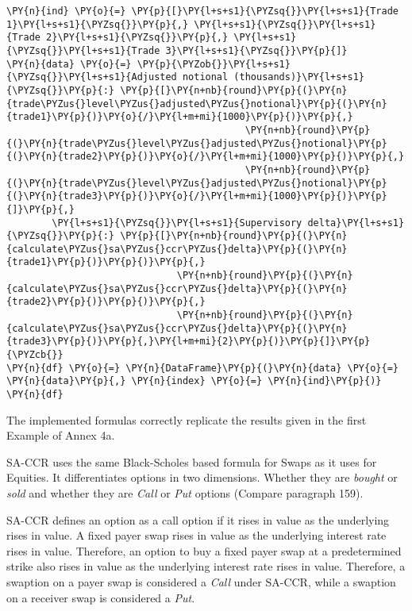     \begin{tcolorbox}[breakable, size=fbox, boxrule=1pt, pad at break*=1mm,colback=cellbackground, colframe=cellborder]
\begin{Verbatim}[commandchars=\\\{\}]
\PY{n}{ind} \PY{o}{=} \PY{p}{[}\PY{l+s+s1}{\PYZsq{}}\PY{l+s+s1}{Trade 1}\PY{l+s+s1}{\PYZsq{}}\PY{p}{,} \PY{l+s+s1}{\PYZsq{}}\PY{l+s+s1}{Trade 2}\PY{l+s+s1}{\PYZsq{}}\PY{p}{,} \PY{l+s+s1}{\PYZsq{}}\PY{l+s+s1}{Trade 3}\PY{l+s+s1}{\PYZsq{}}\PY{p}{]}
\PY{n}{data} \PY{o}{=} \PY{p}{\PYZob{}}\PY{l+s+s1}{\PYZsq{}}\PY{l+s+s1}{Adjusted notional (thousands)}\PY{l+s+s1}{\PYZsq{}}\PY{p}{:} \PY{p}{[}\PY{n+nb}{round}\PY{p}{(}\PY{n}{trade\PYZus{}level\PYZus{}adjusted\PYZus{}notional}\PY{p}{(}\PY{n}{trade1}\PY{p}{)}\PY{o}{/}\PY{l+m+mi}{1000}\PY{p}{)}\PY{p}{,}
                                          \PY{n+nb}{round}\PY{p}{(}\PY{n}{trade\PYZus{}level\PYZus{}adjusted\PYZus{}notional}\PY{p}{(}\PY{n}{trade2}\PY{p}{)}\PY{o}{/}\PY{l+m+mi}{1000}\PY{p}{)}\PY{p}{,}
                                          \PY{n+nb}{round}\PY{p}{(}\PY{n}{trade\PYZus{}level\PYZus{}adjusted\PYZus{}notional}\PY{p}{(}\PY{n}{trade3}\PY{p}{)}\PY{o}{/}\PY{l+m+mi}{1000}\PY{p}{)}\PY{p}{]}\PY{p}{,}
        \PY{l+s+s1}{\PYZsq{}}\PY{l+s+s1}{Supervisory delta}\PY{l+s+s1}{\PYZsq{}}\PY{p}{:} \PY{p}{[}\PY{n+nb}{round}\PY{p}{(}\PY{n}{calculate\PYZus{}sa\PYZus{}ccr\PYZus{}delta}\PY{p}{(}\PY{n}{trade1}\PY{p}{)}\PY{p}{)}\PY{p}{,}
                              \PY{n+nb}{round}\PY{p}{(}\PY{n}{calculate\PYZus{}sa\PYZus{}ccr\PYZus{}delta}\PY{p}{(}\PY{n}{trade2}\PY{p}{)}\PY{p}{)}\PY{p}{,}
                              \PY{n+nb}{round}\PY{p}{(}\PY{n}{calculate\PYZus{}sa\PYZus{}ccr\PYZus{}delta}\PY{p}{(}\PY{n}{trade3}\PY{p}{)}\PY{p}{,}\PY{l+m+mi}{2}\PY{p}{)}\PY{p}{]}\PY{p}{\PYZcb{}}
\PY{n}{df} \PY{o}{=} \PY{n}{DataFrame}\PY{p}{(}\PY{n}{data} \PY{o}{=} \PY{n}{data}\PY{p}{,} \PY{n}{index} \PY{o}{=} \PY{n}{ind}\PY{p}{)}
\PY{n}{df}
\end{Verbatim}
\end{tcolorbox}

    The implemented formulas correctly replicate the results given in the
first Example of Annex 4a.

    SA-CCR uses the same Black-Scholes based formula for Swaps as it uses
for Equities. It differentiates options in two dimensions. Whether they
are \emph{bought} or \emph{sold} and whether they are \emph{Call} or
\emph{Put} options (Compare paragraph 159).

SA-CCR defines an option as a call option if it rises in value as the
underlying rises in value. A fixed payer swap rises in value as the
underlying interest rate rises in value. Therefore, an option to buy a
fixed payer swap at a predetermined strike also rises in value as the
underlying interest rate rises in value. Therefore, a swaption on a
payer swap is considered a \emph{Call} under SA-CCR, while a swaption on
a receiver swap is considered a \emph{Put}.


